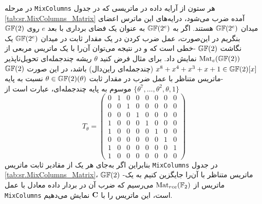 در مرحله 
\texttt{MixColumns}
هر ستون از آرایه داده در ماتریسی که در جدول 
\ref{tab:sr.MixColumns_Matrix}
آمده ضرب می‌شود، درایه‌های این ماترس اعضای میدان 
$\mathbb{GF}(2^{e})$
هستند.  اگر به 
$\mathbb{GF}(2^{e})$
به عنوان یک فضای برداری با بعد 
$e$
 روی 
$\mathbb{GF}(2)$
بنگریم در این‌صورت،  عمل ضرب کردن در یک مقدار ثابت در میدان 
$\mathbb{GF}(2^{e})$
یک نگاشت 
$\mathbb{GF}(2)$
-خطی است که و در نتیجه می‌توان آن‌را با یک ماتریس مربعی از 
$\operatorname{\mathrm{Mat}}_{e}(\mathbb{GF}(2))$
نمایش داد. برای مثال فرض کنید 
$\theta$
 ریشه چندجمله‌ای تحویل‌ناپذیر 
 $x^{8} + x^{4} + x^{3} + x + 1\in\mathbb{GF}(2)[x]$
 (چندجمله‌ای راین‌دال) باشد، در این صورت 
 $\mathbb{GF}(2)$
 -ماتریس متناظر با عمل ضرب در مقدار ثابت 
 $\theta\in\mathbb{GF}(2)(\theta)$
 نسبت به پایه  
 $\{\theta^{7},\ldots,\theta^{2},\theta, 1\}$
 موسوم به پایه چندجمله‌ای، عبارت است از 
 $$T_{\theta} =  \begin{pmatrix}
 0 & 1 & 0 & 0 & 0 & 0 & 0 & 0 \\
 0 & 0 & 1 & 0 & 0 & 0 & 0 & 0 \\
 0 & 0 & 0 & 1 & 0 & 0 & 0 & 0 \\
 1 & 0 & 0 & 0 & 1 & 0 & 0 & 0 \\
 1 & 0 & 0 & 0 & 0 & 1 & 0 & 0 \\
 0 & 0 & 0 & 0 & 0 & 0 & 1 & 0 \\
 1 & 0 & 0 & 0 & 0 & 0 & 0 & 1 \\
 1 & 0 & 0 & 0 & 0 & 0 & 0 & 0
 \end{pmatrix}$$
بنابراین اگر به‌جای هر یک از مقادیر ثابت ماتریس 
\texttt{MixColumns}
در جدول 
\ref{tab:sr.MixColumns_Matrix}، 
$\mathbb{GF}(2)$
-ماتریس متناظر با آن‌را جایگزین کنیم به یک ماتریس از 
$\operatorname{\mathrm{Mat}}_{rce}(\mathbb{F}_{2})$
می‌رسیم که ضرب آن در بردار داده معادل با عمل 
\texttt{MixColumns}
است، این ماتریس را با 
$\bf{C}$
نمایش می‌دهیم. 


